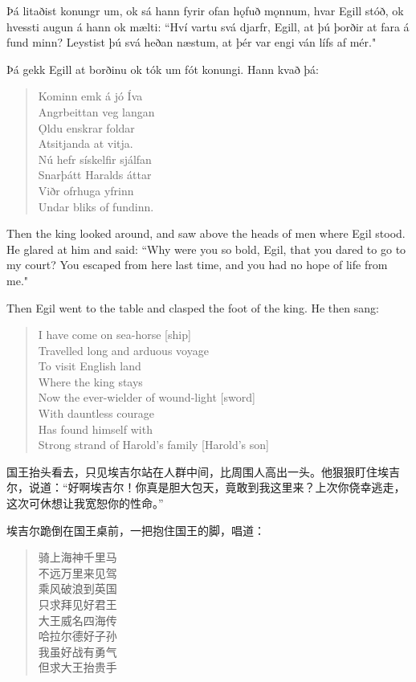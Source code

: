 \begin{paracol}{2}
    Þá litaðist konungr um, ok sá hann fyrir ofan hǫfuð mǫnnum, hvar Egill stóð, ok hvessti augun á hann ok mælti: ``Hví vartu svá djarfr, Egill, at þú þorðir at fara á fund minn? Leystist þú svá heðan næstum, at þér var engi ván lífs af mér."

    Þá gekk Egill at borðinu ok tók um fót konungi. Hann kvað þá:
    \begin{quote}
        Kominn emk á jó Íva\\
        Angrbeittan veg langan\\
        \MakeUppercase{ǫ}ldu enskrar foldar\\
        Atsitjanda at vitja.\\
        Nú hefr sískelfir sjálfan\\
        Snarþátt Haralds áttar\\
        Viðr ofrhuga yfrinn\\
        Undar bliks of fundinn.
    \end{quote}
    \switchcolumn
    Then the king looked around, and saw above the heads of men where Egil stood. He glared at him and said: ``Why were you so bold, Egil, that you dared to go to my court? You escaped from here last time, and you had no hope of life from me."

    Then Egil went to the table and clasped the foot of the king. He then sang:
    \begin{quote}
        I have come on sea-horse [ship]\\
        Travelled long and arduous voyage\\
        To visit English land\\
        Where the king stays\\
        Now the ever-wielder of wound-light [sword]\\
        With dauntless courage\\
        Has found himself with\\
        Strong strand of Harold's family [Harold's son]
    \end{quote}
\end{paracol}
\begin{translation*}{}
    国王抬头看去，只见埃吉尔站在人群中间，比周围人高出一头。他狠狠盯住埃吉尔，说道：“好啊埃吉尔！你真是胆大包天，竟敢到我这里来？上次你侥幸逃走，这次可休想让我宽恕你的性命。”

    埃吉尔跪倒在国王桌前，一把抱住国王的脚，唱道：

    \begin{quote}
        骑上海神千里马\\
        不远万里来见驾\\
        乘风破浪到英国\\
        只求拜见好君王\\
        大王威名四海传\\
        哈拉尔德好子孙\\
        我虽好战有勇气\\
        但求大王抬贵手
    \end{quote}

\end{translation*}
